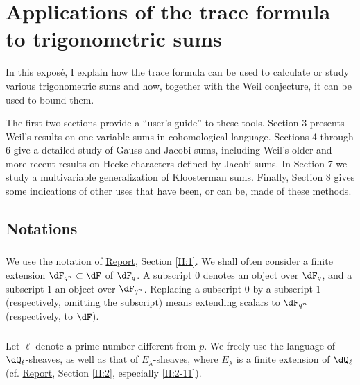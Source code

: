 \documentclass[12pt,oneside,english]{smfbook}
\newcounter{char}
\begin{document}
\chapter{Applications of the trace formula to trigonometric sums}\label{VI}

In this exposé, I explain how the trace formula can be used to calculate or study various trigonometric sums and how, together with the Weil conjecture, it can be used to bound them.

The first two sections provide a ``user's guide'' to these tools. Section 3 presents Weil's results on one-variable sums in cohomological language. Sections 4 through 6 give a detailed study of Gauss and Jacobi sums, including Weil's older and more recent results on Hecke characters defined by Jacobi sums. In Section 7 we study a multivariable generalization of Kloosterman sums. Finally, Section 8 gives some indications of other uses that have been, or can be, made of these methods.

\section*{Notations}\label{VI:0}

\subsection{}\label{VI:0-1}

We use the notation of \hyperref[II]{Report}, Section \ref{II:1}. We shall often consider a finite extension $\dF_{q^n}\subset\dF$ of $\dF_q$. A subscript $0$ denotes an object over $\dF_q$, and a subscript $1$ an object over $\dF_{q^n}$. Replacing a subscript $0$ by a subscript $1$ (respectively, omitting the subscript) means extending scalars to $\dF_{q^n}$ (respectively, to $\dF$).

\subsection{}\label{VI:0-2}

Let $\ell$ denote a prime number different from $p$. We freely use the language of $\dQ_\ell$-sheaves, as well as that of $E_\lambda$-sheaves, where $E_\lambda$ is a finite extension of $\dQ_\ell$ (cf. \hyperref[II]{Report}, Section \ref{II:2}, especially \ref{II:2-11}).

\subsection{}\label{VI:0-3}
\end{document}
